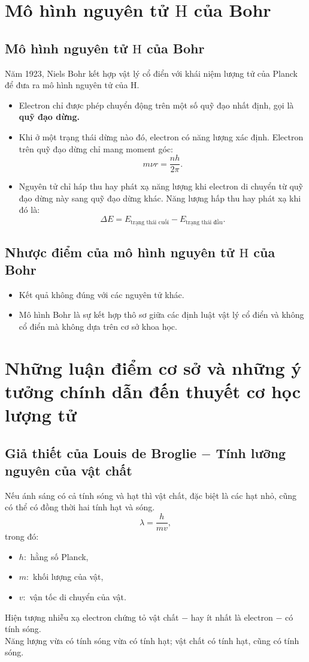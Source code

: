 \section{Mô hình nguyên tử $\mathrm{H}$ của Bohr}
\subsection{Mô hình nguyên tử $\mathrm{H}$ của Bohr}
Năm 1923, Niels Bohr kết hợp vật lý cổ điển với khái niệm lượng tử của Planck để đưa ra mô hình nguyên tử của $\mathrm{H}.$
\begin{itemize}
\item Electron chỉ được phép chuyển động trên một số quỹ đạo nhất định, gọi là \textbf{quỹ đạo dừng.}
\item Khi ở một trạng thái dừng nào đó, electron có năng lượng xác định. Electron trên quỹ đạo dừng chỉ mang moment góc:
$$m \nu r = \frac{nh}{2 \pi}.$$
\item Nguyên tử chỉ háp thu hay phát xạ năng lượng khi electron di chuyển từ quỹ đạo dừng này sang quỹ đạo dừng khác. Năng lượng hấp thu hay phát xạ khi đó là:
$$\Delta E = E_{\text{trạng thái cuối}} - E_{\text{trạng thái đầu}}.$$
\end{itemize}
\subsection{Nhược điểm của mô hình nguyên tử $\mathrm{H}$ của Bohr}
\begin{itemize}
\item Kết quả không đúng với các nguyên tử khác.
\item Mô hình Bohr là sự kết hợp thô sơ giữa các định luật vật lý cổ điển và không cổ điển mà không dựa trên cơ sở khoa học.
\end{itemize}
\section{Những luận điểm cơ sở và những ý tưởng chính dẫn đến thuyết cơ học lượng tử}
\subsection{Giả thiết của Louis de Broglie $-$ Tính lưỡng nguyên của vật chất}
Nếu ánh sáng có cả tính sóng và hạt thì vật chất, đặc biệt là các hạt nhỏ, cũng có thể có đồng thời hai tính hạt và sóng.
$$\lambda = \frac{h}{mv},$$
trong đó:
\begin{itemize}
\item $h:$ hằng số Planck,
\item $m:$ khối lượng của vật,
\item $v:$ vận tốc di chuyển của vật.
\end{itemize}
Hiện tượng nhiễu xạ electron chứng tỏ vật chất $-$ hay ít nhất là electron $-$ có tính sóng.\\
Năng lượng vừa có tính sóng vừa có tính hạt; vật chất có tính hạt, cũng có tính sóng.
